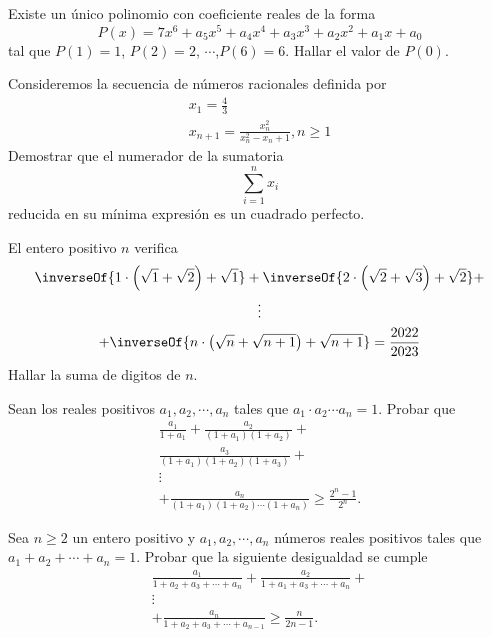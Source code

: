 \begin{section-problem}
    Existe un único polinomio con coeficiente reales de la forma
    \[P(x) =  7x^6 + a_5 x^5 + a_4 x^4 + a_3 x^3 + a_2 x^2 + a_1 x + a_0\]
    tal que $P(1) = 1$, $P(2) = 2$, $\cdots$,$P(6) = 6$.
    Hallar el valor de $P(0)$.
\end{section-problem}

\begin{section-problem}
    Consideremos la secuencia de números racionales definida por
    \begin{gather*}
        x_1 = \frac{4}{3} \\
        x_{n + 1} = \frac{x_n^2}{x_n^2 - x_n + 1}, n \geq 1
    \end{gather*}
    Demostrar que el numerador de la sumatoria
    \[\sum_{i = 1}^{n} x_i\]
    reducida en su mínima expresión es un cuadrado perfecto.
\end{section-problem}

\begin{section-problem}
    El entero positivo $n$ verifica
    \begin{gather*}
        \inverseOf{1\cdot\left(\sqrt {1} + \sqrt {2}\right) + \sqrt {1}} +
        \inverseOf{2\cdot\left(\sqrt {2} + \sqrt {3}\right) + \sqrt {2}} + \\
        \vdots\\
        + \inverseOf{n\cdot\left(\sqrt {n} + \sqrt {n + 1}\right) + \sqrt {n + 1}} = \frac{2022}{2023}
    \end{gather*}
    Hallar la suma de digitos de $n$.
\end{section-problem}

\begin{section-problem}
    Sean los reales positivos $a_1, a_2, \cdots, a_n$ tales que $a_1 \cdot a_2 \cdots a_n = 1$.
    Probar que
    \begin{gather*}
        \frac{a_1}{1 + a_1} + \frac{a_2}{(1 + a_1)(1 + a_2)} + \\
        \frac{a_3}{(1 + a_1)(1 + a_2)(1 + a_3)} + \\
        \vdots\\
        + \frac{a_n}{(1 + a_1)(1 + a_2)\cdots(1 + a_n)} \geq \frac{2^n - 1}{2^n}.
    \end{gather*}
\end{section-problem}

\begin{section-problem}
    Sea $n\geq 2$ un entero positivo y $a_1, a_2, \cdots, a_n$ números reales positivos tales que $a_1 + a_2 + \cdots + a_n = 1$.
    Probar que la siguiente desigualdad se cumple
    \begin{gather*}
        \frac{a_1}{1 + a_2 + a_3 + \cdots + a_n} + \frac{a_2}{1 + a_1 + a_3 + \cdots + a_n} +\\
        \vdots\\
        + \frac{a_n}{1 + a_2 + a_3 + \cdots + a_{n - 1}} \geq \frac{n}{2n - 1}.
    \end{gather*}
\end{section-problem}

